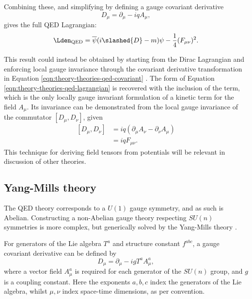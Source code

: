 Combining these, and simplifying by defining a gauge covariant derivative
\begin{equation}
  D_\mu = \partial_\mu - iqA_\mu,
  \label{eqn:theory-theories-qed-covariant}
\end{equation}
gives the full \ac{QED} Lagrangian:
%
\begin{equation}
  \LQED = \overline{\psi}(i\slashed{D} - m)\psi
                   - \frac14 (F_{\mu\nu})^2.
  \label{eqn:theory-theories-qed-lagrangian}
\end{equation}

This result could instead be obtained by starting from the Dirac Lagrangian and
enforcing local gauge invariance through the covariant derivative transformation
in Equation \ref{eqn:theory-theories-qed-covariant} \cite[pp.482-6]{Peskin1995}.
The form of Equation \ref{eqn:theory-theories-qed-lagrangian} is recovered with
the inclusion of the \LEM term, which is the only locally gauge invariant
formulation of a kinetic term for the field $A_\mu$. Its invariance can be
demonstrated from the local gauge invariance of the commutator $[D_\mu,D_\nu]$,
given
\begin{equation}
  \begin{split}
    [D_\mu,D_\nu] &= iq(\partial_\mu A_\nu - \partial_\nu A_\mu)\\
                  &= iqF_{\mu\nu}.
  \end{split}
  \label{eqn:theory-theories-qed-covariant-commutator}
\end{equation}
%
This technique for deriving field tensors from potentials will be relevant in
discussion of other theories.


\subsection{Yang-Mills theory}
\label{sec:theory-theories-ym}

The \ac{QED} theory corresponds to a $U(1)$ gauge symmetry, and
as such is Abelian. Constructing a non-Abelian gauge theory respecting $SU(n)$
symmetries is more complex, but generically solved by the Yang-Mills theory
\cite{Yang1954}.

For generators of the Lie algebra $T^a$ and structure constant $f^{abc}$,
a gauge covariant derivative can be defined by
\begin{equation*}
  D_\mu = \partial_\mu - igT^a A^a_\mu,
\end{equation*}
where a vector field $A^a_\mu$ is required for each generator of the $SU(n)$
group, and $g$ is a coupling constant. Here the exponents $a,b,c$ index the
generators of the Lie algebra, whilst $\mu,\nu$ index space-time dimensions, as
per convention. 

